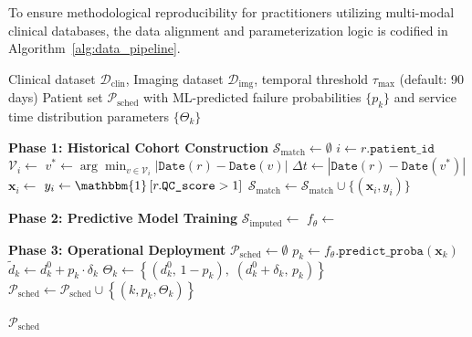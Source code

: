 \documentclass[msom,blindrev]{informs3}
\begin{document}
To ensure methodological reproducibility for practitioners utilizing multi-modal clinical databases, the data alignment and parameterization logic is codified in Algorithm~\ref{alg:data_pipeline}.

\begin{algorithm}[H]
\caption{Asynchronous Data Alignment and Stochastic Parameterization}
\label{alg:data_pipeline}
\begin{algorithmic}[1]
\Require Clinical dataset $\mathcal{D}_{\text{clin}}$, Imaging dataset $\mathcal{D}_{\text{img}}$, temporal threshold $\tau_{\max}$ (default: 90 days)
\Ensure Patient set $\mathcal{P}_{\text{sched}}$ with ML-predicted failure probabilities $\{p_k\}$ and service time distribution parameters $\{\Theta_k\}$

\Statex \textbf{Phase 1: Historical Cohort Construction}
\State $\mathcal{S}_{\text{match}} \gets \emptyset$ 
    \State $i \gets r.\texttt{patient\_id}$
    \State $\mathcal{V}_i \gets$  
    \State $v^* \gets \arg\min_{v \in \mathcal{V}_i} \left| \texttt{Date}(r) - \texttt{Date}(v) \right|$
    \State $\Delta t \gets \left| \texttt{Date}(r) - \texttt{Date}(v^*) \right|$
        \State $\mathbf{x}_i \gets$  
        \State $y_i \gets \mathbbm{1}\left[ r.\texttt{QC\_score} > 1 \right]$ 
        \State $\mathcal{S}_{\text{match}} \gets \mathcal{S}_{\text{match}} \cup \{(\mathbf{x}_i, y_i)\}$
    \EndIf
\EndFor

\Statex \textbf{Phase 2: Predictive Model Training}
\State $\mathcal{S}_{\text{imputed}} \gets$  
\State $f_{\theta} \gets$ 

\Statex \textbf{Phase 3: Operational Deployment}
\State $\mathcal{P}_{\text{sched}} \gets \emptyset$
    \State $p_k \gets f_{\theta}.\texttt{predict\_proba}(\mathbf{x}_k)$ 
    \State $\tilde{d}_k \gets d_k^0 + p_k \cdot \delta_k$ 
    \State $\Theta_k \gets \left\{ (d_k^0,\, 1 - p_k),\; (d_k^0 + \delta_k,\, p_k) \right\}$ 
    \State $\mathcal{P}_{\text{sched}} \gets \mathcal{P}_{\text{sched}} \cup \left\{ (k, p_k, \Theta_k) \right\}$
\EndFor

\State \Return $\mathcal{P}_{\text{sched}}$
\end{algorithmic}
\end{algorithm}
 
\end{document}

